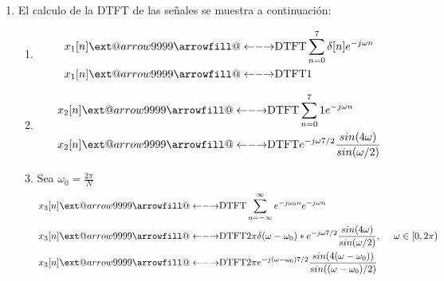 \documentclass[letterpaper,onecolumn,10pt,journal,final]{IEEEtran}
\makeatletter
\newcommand\xleftrightarrow[2][]{%
  \ext@arrow 9999{\longleftrightarrowfill@}{#1}{#2}}
\newcommand\longleftrightarrowfill@{%
  \arrowfill@\leftarrow\relbar\rightarrow}
\makeatother
\begin{document}
\begin{enumerate}[1)]
    
    \item %
       
El calculo de la DTFT de las señales se muestra a continuación:
\begin{enumerate}
    \item
\begin{equation*}
\begin{split}
    x_1 [n] &\xleftrightarrow{\text{DTFT}} \sum _{ n = 0} ^{7} \delta [n] e^{-j \omega n} \\
    x_1 [n] &\xleftrightarrow{\text{DTFT}} 1 
\end{split}
\end{equation*}

    \item 
\begin{equation*}
\begin{split}
    x_2 [n] &\xleftrightarrow{\text{DTFT}} \sum _{ n = 0} ^{7} 1 e^{-j \omega n} \\
    x_2 [n] &\xleftrightarrow{\text{DTFT}} e^{-j \omega 7/2}\frac{sin(4\omega )}{sin(\omega/2)} \\
\end{split}
\end{equation*}

    \item Sea $\omega _0 = \frac{ 2 \pi }{N}$ 
\begin{equation*}
\begin{split}
    x_3 [n] &\xleftrightarrow{\text{DTFT}} \sum _{ n = - \infty} ^{\infty} e^{-j \omega _0 n} e^{-j \omega n} \\
    x_3 [n] &\xleftrightarrow{\text{DTFT}} 2 \pi \delta ( \omega - \omega _0 )\ast e^{-j \omega 7/2}\frac{sin(4\omega )}{sin(\omega/2)} , ~~~~ \omega \in [0 , 2 \pi)  \\
    x_3[n]&\xleftrightarrow{\text{DTFT}} 2 \pi e^{-j (\omega-\omega_0) 7/2}\frac{sin(4(\omega-\omega_0) )}{sin((\omega-\omega_0)/2)} \\
\end{split}
\end{equation*}


\end{enumerate}
\end{enumerate}
\end{document}
